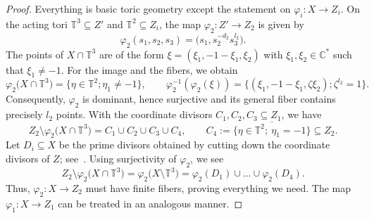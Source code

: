 \documentclass[10pt,a4paper]{amsart}
\theoremstyle{definition}
\def\CC{{\mathbb C}}
\def\TT{{\mathbb T}}
\begin{document}
\begin{proof}
Everything is basic toric geometry except the statement
on $\varphi_i \colon X \to Z_i$.
On the acting tori $\TT^3 \subseteq Z'$ and $\TT^2 \subseteq Z_i$,
the map $\varphi_2 \colon Z' \to Z_2$ is given by
\[
\varphi_2(s_1,s_2,s_3) = \bigl( s_1, s_2^{-d_2}s_3^{l_2} \bigr).
\]
The points of $X \cap \TT^3$ are of the form
$\xi = (\xi_1, -1-\xi_1, \xi_2)$ with
$\xi_1, \xi_2 \in \CC^*$ such that $\xi_1 \ne -1$.
For the image and the fibers, we obtain
\[
\varphi_2\bigl(X \cap \TT^3\bigr)
=
\bigl\{\eta \in \TT^2; \eta_1 \ne -1\bigr\},
\qquad
\varphi_2^{-1}(\varphi_2(\xi))
=
\bigl\{(\xi_1, -1-\xi_1, \zeta \xi_2); \zeta^{l_2} = 1\bigr\}.
\]
Consequently, $\varphi_2$ is dominant, hence surjective
and its general fiber contains precisely $l_2$ points.
With the coordinate divisors $C_1,C_2,C_3 \subseteq Z_1$,
we have
\[
Z_2 \setminus \varphi_2\bigl(X \cap \TT^3\bigr)
 =
C_1 \cup C_2 \cup C_3 \cup C_4,
\qquad
C_4
 :=
\overline{\bigl\{\eta \in \TT^2; \ \eta_1 = -1\bigr\}}
 \subseteq
Z_2.
\]
Let $D_i \subseteq X$ be the prime divisors
obtained by cutting down the coordinate divisors
of $Z$; see~\mbox{\cite[Proposition~4.9]{HaHaHaSp}}.
Using surjectivity of $\varphi_2$, we see
\[
Z_2 \setminus \varphi_2\bigl(X \cap \TT^3\bigr)
 =
\varphi_2\bigl(X \setminus \TT^3\bigr)
 =
\varphi_2(D_1) \cup \dots \cup \varphi_2(D_4).
\]
Thus, $\varphi_2 \colon X \to Z_2$ must have
finite fibers, proving everything we need.
The map $\varphi_1 \colon X \to Z_1$ can be
treated in an analogous manner.
\end{proof}
\end{document}
